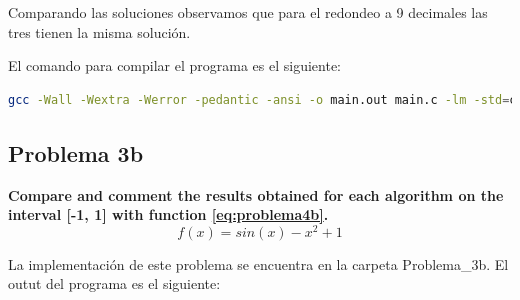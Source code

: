Comparando las soluciones observamos que para el redondeo a 9 decimales las tres tienen la misma solución.

El comando para compilar el programa es el siguiente:

\begin{lstlisting}[language=bash]
    gcc -Wall -Wextra -Werror -pedantic -ansi -o main.out main.c -lm -std=c11
\end{lstlisting}

\subsection*{Problema 3b}
\textbf{Compare and comment the results obtained for each algorithm on the interval [-1, 1] with function \ref{eq:problema4b}.}
\begin{equation}
    f (x) = sin(x) - x^2 + 1
    \label{eq:problema4b}
\end{equation}

La implementación de este problema se encuentra en la carpeta \textcolor{citecolor}{Problema\_3b}. El outut del programa es el siguiente:

